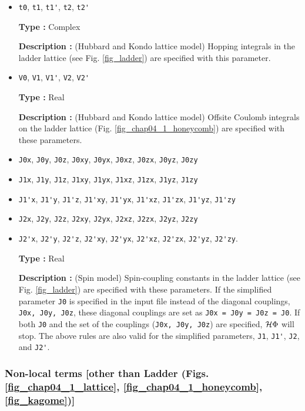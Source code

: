 \begin{itemize}
\item \verb|t0|,  \verb|t1|,  \verb|t1'|,  \verb|t2|,  \verb|t2'|

{\bf Type :} Complex

{\bf Description :} (Hubbard and Kondo lattice model)
Hopping integrals in the ladder lattice 
(see Fig. \ref{fig_ladder}) are specified with this parameter.

\item \verb|V0|,  \verb|V1|,  \verb|V1'|,  \verb|V2|,  \verb|V2'|

{\bf Type :} Real

{\bf Description :} (Hubbard and Kondo lattice model)
Offsite Coulomb integrals on the ladder lattice
(Fig. \ref{fig_chap04_1_honeycomb}) are specified with these parameters.

\item \verb|J0x|, \verb|J0y|, \verb|J0z|, \verb|J0xy|, 
  \verb|J0yx|, \verb|J0xz|, \verb|J0zx|, \verb|J0yz|, \verb|J0zy|
\item \verb|J1x|, \verb|J1y|, \verb|J1z|, \verb|J1xy|, 
  \verb|J1yx|, \verb|J1xz|, \verb|J1zx|, \verb|J1yz|, \verb|J1zy|
\item \verb|J1'x|, \verb|J1'y|, \verb|J1'z|, \verb|J1'xy|, 
  \verb|J1'yx|, \verb|J1'xz|, \verb|J1'zx|, \verb|J1'yz|, \verb|J1'zy|
\item \verb|J2x|, \verb|J2y|, \verb|J2z|, \verb|J2xy|, 
  \verb|J2yx|, \verb|J2xz|, \verb|J2zx|, \verb|J2yz|, \verb|J2zy|
\item \verb|J2'x|, \verb|J2'y|, \verb|J2'z|, \verb|J2'xy|, 
  \verb|J2'yx|, \verb|J2'xz|, \verb|J2'zx|, \verb|J2'yz|, \verb|J2'zy|.

{\bf Type :} Real

{\bf Description :} (Spin model)
Spin-coupling constants in the ladder lattice
(see Fig. \ref{fig_ladder}) are specified with these parameters.
If the simplified parameter \verb|J0| is specified in the input file instead of
the diagonal couplings, \verb|J0x, J0y, J0z|,
these diagonal couplings are set as \verb|J0x = J0y = J0z = J0|.
If both \verb|J0| and the set of the couplings (\verb|J0x, J0y, J0z|)
are specified, $\mathcal{H} \Phi$ will stop.
The above rules are also valid for the simplified parameters, \verb|J1|, \verb|J1'|, \verb|J2|, and \verb|J2'|.

\end{itemize}

\subsubsection{Non-local terms [other than Ladder (Figs. \ref{fig_chap04_1_lattice}, \ref{fig_chap04_1_honeycomb},
\ref{fig_kagome})]}


